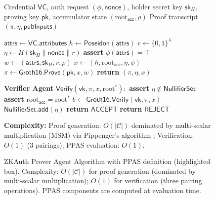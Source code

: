 \documentclass[journal,12pt,onecolumn]{IEEEtran}
\begin{document}
\begin{figure}[t]
\caption{ZKAuth Prover Agent Algorithm with PPAS definition (highlighted
box). Complexity: $O(|\mathcal{C}|)$ for proof generation (dominated
by multi-scalar multiplication); $O(1)$ for verification (three
pairing operations). PPAS components are computed at evaluation time.}
\label{fig:algorithm}
\begin{algorithmic}[1]
\footnotesize
\Require Credential $\mathsf{VC}$, auth request $(\phi, \mathsf{nonce})$,
         holder secret key $\mathsf{sk}_H$, proving key $\mathsf{pk}$,
         accumulator state $(\text{root}_{\mathsf{acc}}, \rho)$
\Ensure Proof transcript $(\pi, \eta, \mathsf{pubInputs})$

\State $\mathsf{attrs} \gets \mathsf{VC}.\mathsf{attributes}$
\State $h \gets \mathsf{Poseidon}(\mathsf{attrs})$
\State $r \gets \{0,1\}^\lambda$ \hfill {}
\State $\eta \gets H(\mathsf{sk}_H \| \mathsf{nonce} \| r)$
\State \textbf{assert} $\phi(\mathsf{attrs}) = \top$
\State $w \gets (\mathsf{attrs}, \mathsf{sk}_H, r, \rho)$
\State $x \gets (h, \text{root}_{\mathsf{acc}}, \eta, \phi)$
\State $\pi \gets \mathsf{Groth16.Prove}(\mathsf{pk}, x, w)$
\State \textbf{return} $(\pi, \eta, x)$

\Statex
\State \hrulefill

\Statex \textbf{Verifier Agent} $\mathsf{Verify}(\mathsf{vk}, \pi, x, \text{root}^*):$
\State \textbf{assert} $\eta \notin \mathsf{NullifierSet}$
\State \textbf{assert} $\text{root}_{\mathsf{acc}} = \text{root}^*$
\State $b \gets \mathsf{Groth16.Verify}(\mathsf{vk}, \pi, x)$
  \State $\mathsf{NullifierSet}.\mathsf{add}(\eta)$
  \State \textbf{return} $\mathsf{ACCEPT}$
\Else
  \State \textbf{return} $\mathsf{REJECT}$
\EndIf

\Statex
\State \hrulefill

\noindent{}

\Statex
\textbf{Complexity:} Proof generation: $O(|\mathcal{C}|)$ dominated by
multi-scalar multiplication (MSM) via Pippenger's algorithm
\cite{pippenger1980evaluation}; Verification: $O(1)$ (3 pairings);
PPAS evaluation: $O(1)$.
\end{algorithmic}
\end{figure}
\end{document}
